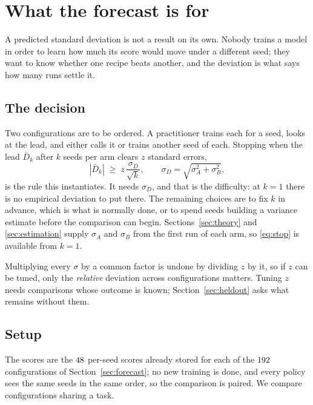 \section{What the forecast is for}
\label{sec:sizing}

A predicted standard deviation is not a result on its own. Nobody trains a model in order to learn
how much its score would move under a different seed; they want to know whether one recipe beats
another, and the deviation is what says how many runs settle it.

\subsection{The decision}

Two configurations are to be ordered. A practitioner trains each for a seed, looks at the lead, and
either calls it or trains another seed of each. Stopping when the lead $\bar D_k$ after $k$ seeds
per arm clears $z$ standard errors,
\begin{equation}
  \label{eq:stop}
  |\bar D_k| \;\ge\; z\,\frac{\sigma_D}{\sqrt{k}},
  \qquad
  \sigma_D=\sqrt{\sigma_A^2+\sigma_B^2},
\end{equation}
is the rule this instantiates. It needs $\sigma_D$, and that is the difficulty: at $k=1$ there is no
empirical deviation to put there. The remaining choices are to fix $k$ in advance, which is what is
normally done, or to spend seeds building a variance estimate before the comparison can begin.
Sections~\ref{sec:theory} and \ref{sec:estimation} supply $\sigma_A$ and $\sigma_B$ from the first
run of each arm, so \eqref{eq:stop} is available from $k=1$.

Multiplying every $\sigma$ by a common factor is undone by dividing $z$ by it, so if $z$ can be
tuned, only the \emph{relative} deviation across configurations matters. Tuning $z$ needs
comparisons whose outcome is known; Section~\ref{sec:heldout} asks what remains without them.

\subsection{Setup}

The scores are the $48$ per-seed scores already stored for each of the $192$
configurations of Section~\ref{sec:forecast}; no new training is done, and every policy sees the
same seeds in the same order, so the comparison is paired. We compare configurations sharing a
task.

